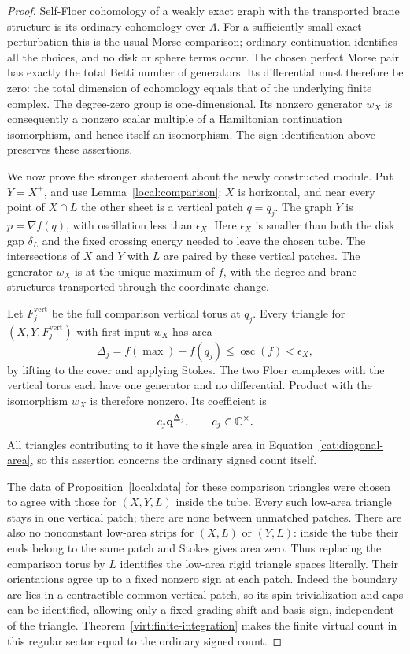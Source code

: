 \begin{proof}
Self-Floer cohomology of a weakly exact graph with the transported brane
structure is its ordinary cohomology over \(\Lambda\).  For a sufficiently
small exact perturbation this is the usual Morse comparison; ordinary
continuation identifies all the choices, and no disk or sphere terms
occur.  The chosen perfect Morse pair has exactly the total Betti
number of generators.  Its differential must therefore be zero:
the total dimension of cohomology equals that of the underlying finite
complex.  The degree-zero group is one-dimensional.  Its nonzero
generator \(w_X\) is consequently a nonzero scalar multiple of a
Hamiltonian continuation isomorphism, and hence itself an isomorphism.
The sign identification above preserves these assertions.

We now prove the stronger statement about the newly constructed
module.  Put \(Y=X^+\), and use Lemma~\ref{local:comparison}:
\(X\) is horizontal, and near every point of
\(X\cap L\) the other sheet is a vertical patch \(q=q_j\).
The graph \(Y\) is \(p=\nabla f(q)\), with oscillation less than
\(\epsilon_X\).  Here \(\epsilon_X\) is smaller than both the disk gap
\(\delta_L\) and the fixed crossing energy needed to leave the chosen
tube.  The intersections of \(X\) and \(Y\) with \(L\) are paired by
these vertical patches.  The generator \(w_X\) is at the unique maximum
of \(f\), with the degree and brane structures transported through the
coordinate change.

Let \(F_j^{\mathrm{vert}}\) be the full comparison vertical torus at
\(q_j\).  Every triangle for
\((X,Y,F_j^{\mathrm{vert}})\) with first input \(w_X\) has area
\begin{equation}\label{cat:diagonal-area}
 \Delta_j=f(\max)-f(q_j)\le\operatorname{osc}(f)<\epsilon_X,
\end{equation}
by lifting to the cover and applying Stokes.
The two Floer complexes with the vertical torus each have one
generator and no differential.  Product with the isomorphism \(w_X\)
is therefore nonzero.  Its coefficient is
\[
 c_j\mathbf q^{\Delta_j},\qquad c_j\in\mathbb C^\times.
\]
All triangles contributing to it have the single area in
Equation~\eqref{cat:diagonal-area}, so this assertion concerns the
ordinary signed count itself.

The data of Proposition~\ref{local:data} for these comparison triangles
were chosen to agree with
those for \((X,Y,L)\) inside the tube.  Every such low-area triangle
stays in one vertical patch; there are none between unmatched patches.
There are also no nonconstant low-area strips for \((X,L)\) or
\((Y,L)\): inside the tube their ends belong to the same patch and
Stokes gives area zero.  Thus replacing the comparison torus by \(L\)
identifies the low-area rigid triangle spaces literally.
Their orientations agree up to a fixed nonzero sign at each patch.
Indeed the boundary arc lies in a contractible common vertical patch,
so its spin trivialization and caps can be identified, allowing only
a fixed grading shift and basis sign, independent of the triangle.
Theorem~\ref{virt:finite-integration} makes the finite virtual count in
this regular sector equal to the ordinary signed count.


\end{proof}
